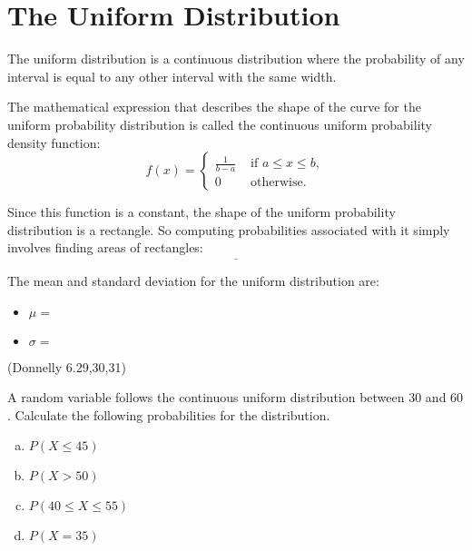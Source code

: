 \documentclass[12pt, letterpaper]{article}
\newcounter{exercise}
\theoremstyle{definition}
\begin{document}
\section*{The Uniform Distribution}

\noindent The uniform distribution is a continuous distribution where the probability of any interval is equal to any other interval with the same width.

\vspace*{.1in}

\noindent The mathematical expression that describes the shape of the curve for the uniform probability distribution is called the continuous uniform probability density function:
$$ f(x) = \begin{cases}
\frac{1}{b-a} & \text{ if } a\leq x\leq b,\\
0 & \text{ otherwise.}
\end{cases} $$

\noindent  Since this function is a constant, the shape of the uniform probability distribution is a rectangle.  So computing probabilities associated with it simply involves finding areas of rectangles: 
$$ \underline{~~~~~~~~~~~~~~~~~~~~~~~~~~~~~~~~~~~~}$$

\vspace*{.1in}

\noindent The mean and standard deviation for the uniform distribution are:
\begin{itemize}
\item $\mu = $
\vspace*{.2in}
\item $\sigma = $
\vspace*{.2in}
\end{itemize}

\newpage


\begin{exercise}  (Donnelly 6.29,30,31)

A random variable follows the continuous uniform distribution between $30$ and $60$.  Calculate the following probabilities for the distribution.

\end{exercise}

\begin{enumerate}[(a)]

\item $P(X\leq 45)$

\vfill

\item $P(X>50)$

\vfill

\item $P(40\leq X\leq 55)$

\vfill

\item $P(X=35)$

\vfill

\end{enumerate}
\end{document}
